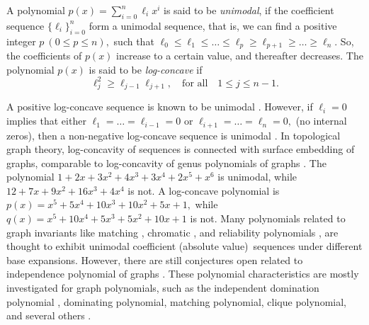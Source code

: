 \documentclass[12pt,twoside]{article}
\begin{document}
A polynomial $ p(x)=\sum_{i=0}^{n} \ell_{i}x^{i} $ is said to be \textit{unimodal}, if the coefficient sequence $\Big\{\ell_{i}\Big\}_{i=0}^{n}$ form a unimodal sequence, that is, we can find a positive integer $ p~(0\leq p\leq n), $ such that $ \ell_{0}\leq \ell_{1}\leq \dots \leq \ell_{p} \geq \ell_{p+1}\geq \dots \geq \ell_{n} $. So, the coefficients of $p(x)$ increase to a certain value, and thereafter  decreases. The polynomial $ p(x) $ is said to be \emph{log-concave} if 
\begin{equation}\label{log con 1}
	\ell_{j}^{2}\geq \ell_{j-1}\ell_{j+1},\quad \text{for all}\quad  1\leq j\leq n-1. 
\end{equation} 

A positive log-concave sequence is known to be unimodal \cite{stanley}. However, if $\ell_{i}=0$ implies that either $\ell_{1}=\dots=\ell_{i-1}=0$ or $\ell_{i+1}=\dots=\ell_{n}=0,$ (no internal zeros), then a non-negative log-concave sequence is unimodal \cite{stanley}. In topological graph theory, log-concavity of sequences is connected with surface embedding of graphs, comparable to log-concavity of genus polynomials of graphs \cite{gross}. The polynomial $ 1 + 2x + 3x^{2} + 4x^{3} + 3x^{4} + 2x^{5}+x^{6} $ is unimodal, while $ 12 + 7x + 9x^{2} + 16x^{3} + 4x^{4} $ is not. A log-concave polynomial is $p(x) = x^5 + 5x^4 + 10x^3 + 10x^2 + 5x + 1,$ while $q(x) = x^5 + 10x^4 + 5x^3 + 5x^2 + 10x + 1$ is not.
Many polynomials related to graph invariants like matching \cite{heilmann}, chromatic \cite{huh}, and reliability polynomials \cite{huh1}, are thought to exhibit unimodal coefficient (absolute value) sequences under different base expansions. However, there are still conjectures open related to independence polynomial of graphs \cite{alavi,levitejc,micheal,browncameron}.
 These polynomial characteristics are mostly investigated for graph polynomials, such as the independent domination polynomial \cite{bilaltcs, bilaljcmcc}, dominating polynomial, matching polynomial, clique polynomial, and several others \cite{huh1,gross, bilaldml,bilalsc,bilaltcs,bilaljac}. 

\medskip
\end{document}
